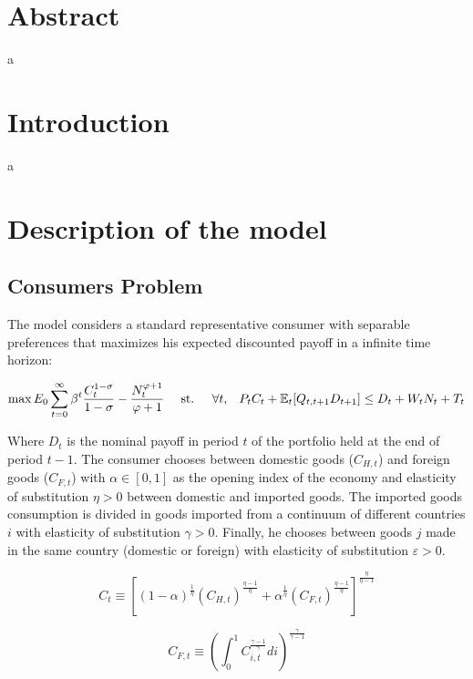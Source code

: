 \documentclass{article}
\newcommand{\Et}{\mathbb{E}_t}
\begin{document}
\section*{Abstract}
a

\section{Introduction}
a

\section{Description of the model}

\subsection{Consumers Problem}
The model considers a standard representative consumer with separable preferences that maximizes his expected discounted payoff in a infinite time horizon:

\begin{equation}
    \max E_0 \sum^\infty_{t=0} \beta^t \frac{C_t^{1-\sigma}}{1-\sigma} - \frac{N_t^{\varphi+1}}{\varphi+1} \hspace{1em}  \textrm{ st. } \hspace{1em} \forall t, \hspace{0.8em} P_t C_t + \Et[Q_{t,t+1} D_{t+1}] \leq D_t +  W_t N_t + T_t
\end{equation}

Where $D_t$ is the nominal payoff in period $t$ of the portfolio held at the end of period $t-1$. The consumer chooses between domestic goods ($C_{H,t}$) and foreign goods ($C_{F,t}$) with $\alpha \in [0,1]$ as the opening index of the economy and elasticity of substitution $\eta > 0$ between domestic and imported goods. The imported goods consumption is divided in goods imported from a continuum of different countries $i$ with elasticity of substitution $\gamma > 0$. Finally, he chooses between goods $j$ made in the same country (domestic or foreign) with elasticity of substitution $\varepsilon > 0$.

\begin{equation}
    C_t \equiv \left[ (1-\alpha)^{\frac{1}{\eta}} (C_{H,t})^{\frac{\eta-1}{\eta}} + \alpha^{\frac{1}{\eta}} (C_{F,t})^{\frac{\eta-1}{\eta}} \right]^{\frac{\eta}{\eta-1}}
\end{equation}

\begin{equation}
    C_{F,t} \equiv \left( \int^1_0 C_{i,t}^{\frac{\gamma-1}{\gamma}} di \right)^{\frac{\gamma}{\gamma-1}}
\end{equation}
\end{document}
